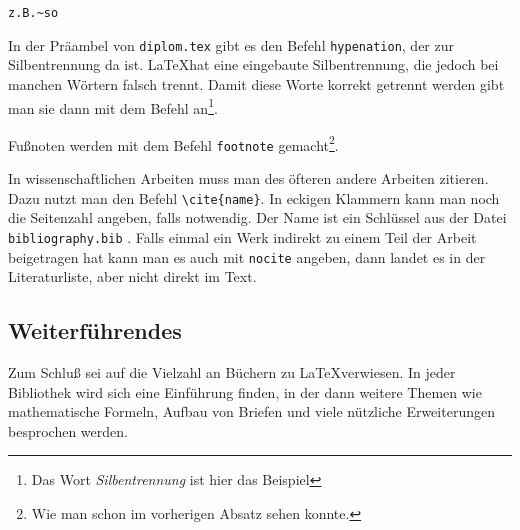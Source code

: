\begin{verbatim}
z.B.~so
\end{verbatim}

In der Präambel von \verb|diplom.tex| gibt es den Befehl \verb|hypenation|, der zur Silbentrennung da ist. \LaTeX hat eine eingebaute Silbentrennung, die jedoch bei manchen Wörtern falsch trennt. Damit diese Worte korrekt getrennt werden gibt man sie dann mit dem Befehl an\footnote{Das Wort \emph{Silbentrennung} ist hier das Beispiel}.

Fußnoten werden mit dem Befehl \verb|footnote| gemacht\footnote{Wie man schon im vorherigen Absatz sehen konnte.}.

In wissenschaftlichen Arbeiten muss man des öfteren andere Arbeiten zitieren. Dazu nutzt man den Befehl \verb|\cite{name}|. In eckigen Klammern kann man noch die Seitenzahl angeben, falls notwendig. Der Name ist ein Schlüssel aus der Datei \verb|bibliography.bib| \cite[S.~10]{Schneider2009}. Falls einmal ein Werk indirekt zu einem Teil der Arbeit beigetragen hat kann man es auch mit \verb|nocite| angeben, dann landet es in der Literaturliste, aber nicht direkt im Text.


\subsection{Weiterführendes}

Zum Schluß sei auf die Vielzahl an Büchern zu \LaTeX verwiesen. In jeder Bibliothek wird sich eine Einführung finden, in der dann weitere Themen wie mathematische Formeln, Aufbau von Briefen und viele nützliche Erweiterungen besprochen werden.

